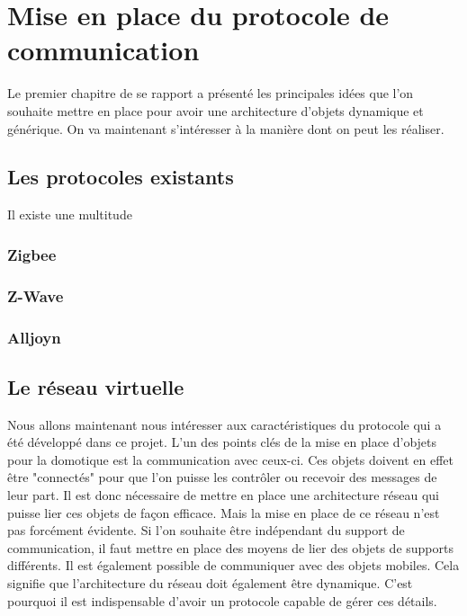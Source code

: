\chapter{Mise en place du protocole de communication}
	Le premier chapitre de se rapport a présenté les principales idées que l'on souhaite mettre en 
	place pour avoir une architecture d'objets dynamique et générique. On va maintenant s'intéresser
	à la manière dont on peut les réaliser.


\section{Les protocoles existants}
	Il existe une multitude

	\subsection{Zigbee}
	\subsection{Z-Wave}
	\subsection{Alljoyn}
	

\section{Le réseau virtuelle}
	Nous allons maintenant nous intéresser aux caractéristiques du protocole qui a été
	développé dans ce projet. L'un des points clés de la mise en place d'objets pour la domotique 
	est la communication avec ceux-ci. Ces objets doivent en effet être "connectés" pour que l'on
	puisse les contrôler ou recevoir des messages de leur part. Il est donc nécessaire de mettre en 
	place une architecture réseau qui puisse lier ces objets de façon efficace. Mais la mise en place
	de ce réseau n'est pas forcément évidente. Si l'on souhaite être indépendant du support de 
	communication, il faut mettre en place des moyens de lier des objets de supports différents. Il 
	est également possible de communiquer avec des objets mobiles. Cela signifie que l'architecture 
	du réseau doit également être dynamique. C'est pourquoi il est indispensable d'avoir un protocole
	capable de gérer ces détails.
	
